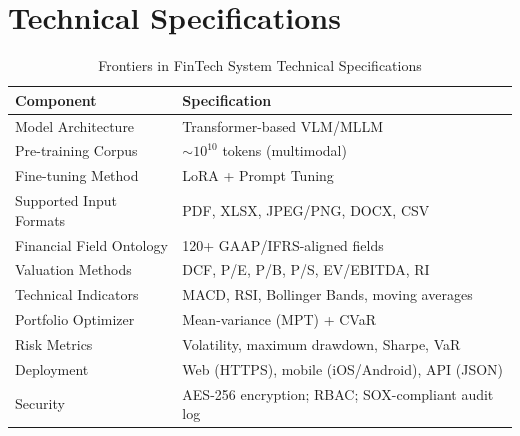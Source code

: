 \documentclass[12pt,letterpaper]{article}
\begin{document}
\newpage
\section{Technical Specifications}
\label{app:specs}

\begin{table}[H]
  \singlespacing
  \centering
  \caption{Frontiers in FinTech System Technical Specifications}
  \label{tab:specs}
  \begin{tabular}{@{}ll@{}}
    \toprule
    \textbf{Component} & \textbf{Specification} \\
    \midrule
    Model Architecture      & Transformer-based VLM/MLLM \\
    Pre-training Corpus     & ${\sim}10^{10}$ tokens (multimodal) \\
    Fine-tuning Method      & LoRA + Prompt Tuning \\
    Supported Input Formats & PDF, XLSX, JPEG/PNG, DOCX, CSV \\
    Financial Field Ontology & 120+ GAAP/IFRS-aligned fields \\
    Valuation Methods       & DCF, P/E, P/B, P/S, EV/EBITDA, RI \\
    Technical Indicators    & MACD, RSI, Bollinger Bands, moving averages \\
    Portfolio Optimizer     & Mean-variance (MPT) + CVaR \\
    Risk Metrics            & Volatility, maximum drawdown, Sharpe, VaR \\
    Deployment              & Web (HTTPS), mobile (iOS/Android), API (JSON) \\
    Security                & AES-256 encryption; RBAC; SOX-compliant
                              audit log \\
    \bottomrule
  \end{tabular}
\end{table}
\end{document}
